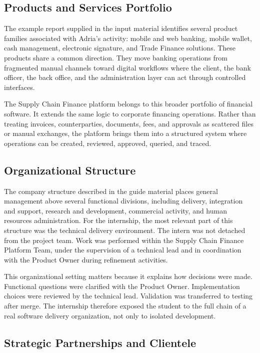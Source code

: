 \subsection{Products and Services Portfolio}
\label{subsec:products_services}

The example report supplied in the input material identifies several product families associated with Adria's activity: mobile and web banking, mobile wallet, cash management, electronic signature, and Trade Finance solutions. These products share a common direction. They move banking operations from fragmented manual channels toward digital workflows where the client, the bank officer, the back office, and the administration layer can act through controlled interfaces.

The Supply Chain Finance platform belongs to this broader portfolio of financial software. It extends the same logic to corporate financing operations. Rather than treating invoices, counterparties, documents, fees, and approvals as scattered files or manual exchanges, the platform brings them into a structured system where operations can be created, reviewed, approved, queried, and traced.

\subsection{Organizational Structure}
\label{subsec:organizational_structure}

The company structure described in the guide material places general management above several functional divisions, including delivery, integration and support, research and development, commercial activity, and human resources administration. For the internship, the most relevant part of this structure was the technical delivery environment. The intern was not detached from the project team. Work was performed within the Supply Chain Finance Platform Team, under the supervision of a technical lead and in coordination with the Product Owner during refinement activities.

This organizational setting matters because it explains how decisions were made. Functional questions were clarified with the Product Owner. Implementation choices were reviewed by the technical lead. Validation was transferred to testing after merge. The internship therefore exposed the student to the full chain of a real software delivery organization, not only to isolated development.

\subsection{Strategic Partnerships and Clientele}
\label{subsec:partnerships_clientele}

